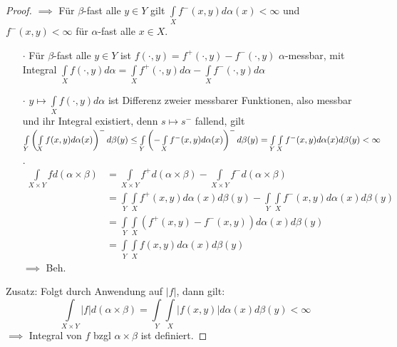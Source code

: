 \begin{proof}
	$\implies$ Für $\beta$-fast alle $y\in Y$ gilt $\int\limits_X f^-(x,y) d\alpha(x) < \infty$ und $f^-(x,y) < \infty$ für $\alpha$-fast alle $x\in X$. 
	\begin{itemize}
		\item[$\cdot$] Für $\beta$-fast alle $y\in Y$ ist $f(\cdot, y) = f^+(\cdot, y) - f^-(\cdot, y)$ $\alpha$-messbar, mit Integral $\int\limits_X f(\cdot, y) d\alpha = \int\limits_X f^+(\cdot,y)d\alpha - \int\limits_X f^-(\cdot,y)d\alpha$
		\item[$\cdot$] $y\mapsto \int\limits_X f(\cdot,y) d\alpha$ ist Differenz zweier messbarer Funktionen, also messbar und ihr Integral existiert, denn $s\mapsto s^-$ fallend, gilt \\
		$\int\limits_Y \left(\int\limits_X f(x,y) d\alpha(x) \right)^- d\beta(y) \leq \int\limits_Y \left(-\int\limits_X f^-(x,y) d\alpha(x) \right)^- d\beta(y) \\= \int\limits_Y \int\limits_X f^-(x,y) d\alpha(x) d\beta(y) < \infty$
		\item[$\cdot$] \begin{equation*}
			\begin{split}
				\int\limits_{X\times Y} f d(\alpha\times\beta) &= \int\limits_{X\times Y} f^+ d(\alpha\times\beta) - \int\limits_{X\times Y} f^- d(\alpha\times\beta) \\
				&= \int\limits_Y \int\limits_X f^+(x,y) d\alpha(x) d\beta(y) - \int\limits_Y \int\limits_X f^-(x,y) d\alpha(x) d\beta(y) \\
				&= \int\limits_Y \int\limits_X \left( f^+(x,y) -f^-(x,y)\right) d\alpha(x) d\beta(y) \\
				&= \int\limits_Y \int\limits_X f(x,y) d\alpha(x) d\beta(y)
			\end{split}
		\end{equation*}
		$\implies$ Beh.
	\end{itemize}
	Zusatz: Folgt durch Anwendung auf $|f|$, dann gilt: $$ \int\limits_{X\times Y} |f| d(\alpha\times\beta) = \int\limits_Y \int\limits_X |f(x,y)|d\alpha(x) d\beta(y) < \infty$$
	$\implies$ Integral von $f$ bzgl $\alpha\times\beta$ ist definiert.
  \end{proof}

